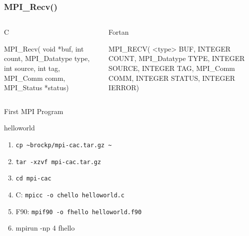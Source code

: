 \documentclass{beamer}
\begin{document}
\begin{frame}[fragile]
 \frametitle{MPI\_Recv()}
   \begin{columns}[T]
    \begin{column}{5cm}
     \begin{block}{C}
      \begin{semiverbatim}
MPI\_Recv( void   *buf,
           int  count,
  MPI\_Datatype   type,
           int source,
           int    tag,
      MPI\_Comm   comm,
    MPI\_Status  *status)
      \end{semiverbatim}
     \end{block}
    \end{column}
    \begin{column}{5cm}
     \begin{block}{Fortan}
      \begin{semiverbatim}
MPI\_RECV( <type>    BUF,
      INTEGER     COUNT,
 MPI\_Datatype      TYPE,
      INTEGER    SOURCE,
      INTEGER       TAG,
     MPI\_Comm      COMM,
      INTEGER    STATUS,
      INTEGER     IERROR)
      \end{semiverbatim}
     \end{block}
    \end{column}
   \end{columns}
\end{frame}

\begin{frame}{First MPI Program}
\begin{block}{helloworld}
 \begin{enumerate}
  \item<1->\texttt{cp \~{}brockp/mpi-cac.tar.gz \~{}}
  \item<1->\texttt{tar -xzvf mpi-cac.tar.gz}
  \item<1->\texttt{cd mpi-cac}
  \item<2-> C: \texttt{mpicc -o chello helloworld.c}
  \item<2-> F90: \texttt{mpif90 -o fhello helloworld.f90}
  \item<3-> mpirun -np 4 fhello
 \end{enumerate}
\end{block}
\end{frame}
\end{document}

